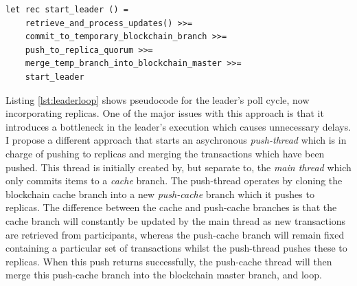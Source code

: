 \documentclass[12pt,a4paper,twoside,openright]{report}
\begin{document}
	\begin{lstlisting}[caption={Naive Leader Loop},label={lst:leaderloop}]
let rec start_leader () = 
	retrieve_and_process_updates() >>= 
	commit_to_temporary_blockchain_branch >>=
	push_to_replica_quorum >>=
	merge_temp_branch_into_blockchain_master >>=
	start_leader
	\end{lstlisting}

	Listing \ref{lst:leaderloop} shows pseudocode for the leader's poll cycle, now incorporating replicas. 
	One of the major issues with this approach is that it introduces a bottleneck in the leader's execution which causes unnecessary delays.
	I propose a different approach that starts an asychronous \textit{push-thread} which is in charge of pushing to replicas and merging the transactions which have been pushed.
	This thread is initially created by, but separate to, the \textit{main thread} which only commits items to a \textit{cache} branch.
	The push-thread operates by cloning the blockchain cache branch into a new \textit{push-cache} branch which it pushes to replicas.
	The difference between the cache and push-cache branches is that the cache branch will constantly be updated by the main thread as new transactions are retrieved from participants, whereas the push-cache branch will remain fixed containing a particular set of transactions whilst the push-thread pushes these to replicas. 
	When this push returns successfully, the push-cache thread will then merge this push-cache branch into the blockchain master branch, and loop. 
\end{document}
